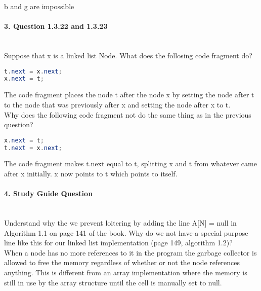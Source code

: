 \documentclass{article}
\begin{document}
\noindent b and g are impossible

\paragraph{\Large 3. Question 1.3.22 and 1.3.23}\mbox{}\\
Suppose that x is a linked list Node. What does the follosing code fragment do?
\begin{lstlisting}[language=Java]
t.next = x.next;
x.next = t;
\end{lstlisting}

The code fragment places the node t after the node x by setting the node after t to the node that was previously after x and setting the node after x to t.\\

\noindent Why does the following code fragment not do the same thing as in the previous question?
\begin{lstlisting}[language=Java]
x.next = t;
t.next = x.next;
\end{lstlisting}

The code fragment makes t.next equal to t, splitting x and t from whatever came after x initially. x now points to t which points to itself.

\paragraph{\Large 4. Study Guide Question}\mbox{}\\
Understand why the we prevent loitering by adding the line A[N] = null in Algorithm 1.1 on page 141 of the book. Why do we not have a special purpose line like this for our linked list implementation (page 149, algorithm 1.2)?\\

When a node has no more references to it in the program the garbage collector is allowed to free the memory regardless of whether or not the node references anything. This is different from an array implementation where the memory is still in use by the array structure until the cell is manually set to null.
\end{document}
